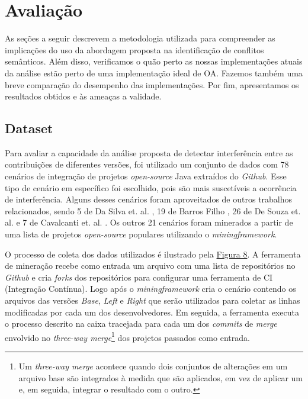 \section{Avaliação}

As seções a seguir descrevem a metodologia utilizada para compreender as implicações do uso da abordagem proposta na identificação de conflitos semânticos. Além disso, verificamos o quão perto as nossas implementações atuais da análise estão perto de uma implementação ideal de OA. Fazemos também uma breve comparação do desempenho das implementações. Por fim, apresentamos os resultados obtidos e às ameaças a validade.

\subsection{Dataset}
Para avaliar a capacidade da análise proposta de detectar interferência entre as contribuições de diferentes versões, foi utilizado um conjunto de dados com 78 cenários de integração de projetos \emph{open-source} Java extraídos do \emph{Github}.  Esse tipo de cenário em específico foi escolhido, pois são mais suscetíveis a ocorrência de interferência. Alguns desses cenários foram aproveitados de outros trabalhos relacionados, sendo 5 de Da Silva et. al. \cite{LeusonSilva2020}, 19 de Barros Filho  \cite{InformationFlowRoberto}, 26 de De Souza et. al. \cite{10.1145/958160.958177} e 7 de Cavalcanti et. al. \cite{10.1109/ASE.2019.00097}. Os outros 21 cenários foram minerados a partir de uma lista de projetos \emph{open-source} populares utilizando o \emph{miningframework}. 

O processo de coleta dos dados utilizados é ilustrado pela \hyperref[fig:mineracao]{Figura 8}. A ferramenta de mineração recebe como entrada um arquivo com uma lista de repositórios no \emph{Github} e cria \emph{forks} dos repositórios para configurar uma ferramenta de CI (Integração Contínua). Logo após o \emph{miningframework} cria o cenário contendo os arquivos das versões \emph{Base}, \emph{Left} e \emph{Right} que serão utilizados para coletar as linhas modificadas por cada um dos desenvolvedores. Em seguida, a ferramenta executa o processo descrito na caixa tracejada para cada um dos \emph{commits} de \emph{merge} envolvido no \emph{three-way merge}\footnote{Um  \emph{three-way merge} acontece quando dois conjuntos de alterações em um arquivo base são integrados à medida que são aplicados, em vez de aplicar um e, em seguida, integrar o resultado com o outro.} dos projetos passados como entrada. 

